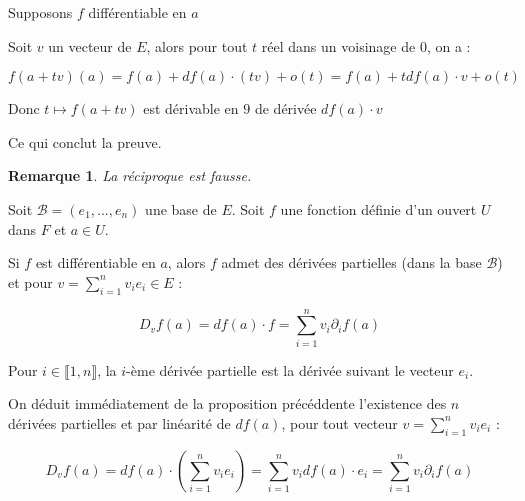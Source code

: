 \documentclass[a4paper,12pt]{book}
\newcommand{\Prop}[2]{\begin{tcolorbox}[sharp corners, colback=white,colframe=red!90!black!75, title=Proposition : #1]#2\end{tcolorbox}}
\newcommand{\Pre}[1]{\begin{tcolorbox}[sharp corners, colback=white,colframe=green!60!green!30!black!75, title=Preuve]#1\end{tcolorbox}}
\newtheorem{Rem}{Remarque}[section]
\begin{document}
\Pre{Supposons $f$ différentiable en $a$
\par Soit $v$ un vecteur de $E$, alors pour tout $t$ réel dans un voisinage de $0$, on a :
\par $$f(a+tv)(a)=f(a)+df(a)\cdot(tv)+o(t) = f(a)+tdf(a)\cdot v+o(t)$$
\par Donc $t\mapsto f(a+tv)$ est dérivable en $9$ de dérivée $df(a)\cdot v$
\par Ce qui conclut la preuve.}
\begin{Rem}
La réciproque est fausse.
\end{Rem}
\Prop{Corollaire}{Soit $\mathcal{B}=(e_1,..., e_n)$ une base de $E$. Soit $f$ une fonction définie d'un ouvert $U$ dans $F$ et $a\in U$.
\par Si $f$ est différentiable en $a$, alors $f$ admet des dérivées partielles (dans la base $\mathcal{B}$) et pour $v=\sum\limits_{i=1}^nv_ie_i\in E$ :
\par $$D_vf(a) = df(a)\cdot f = \sum\limits_{i=1}^nv_i\partial_if(a)$$}
\Pre{Pour $i\in\llbracket 1, n\rrbracket$, la $i$-ème dérivée partielle est la dérivée suivant le vecteur $e_i$.
\par On déduit immédiatement de la proposition précéddente l'existence des $n$ dérivées partielles et par linéarité de $df(a)$, pour tout vecteur $v=\sum\limits_{i=1}^nv_ie_i$ :
\par $$D_vf(a) = df(a)\cdot\left(\sum\limits_{i=1}^nv_ie_i\right) = \sum\limits_{i=1}^nv_idf(a)\cdot e_i=\sum\limits_{i=1}^nv_i\partial_if(a)$$}
\end{document}
